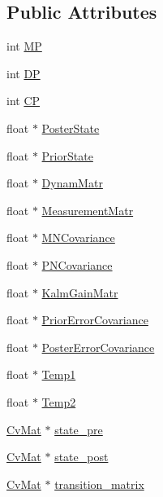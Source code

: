 \subsection*{Public Attributes}
\begin{DoxyCompactItemize}
\item 
int \hyperlink{structCvKalman_a1e9c56ae3f138a19c67d607379e445d9}{M\-P}
\item 
int \hyperlink{structCvKalman_a0202618820441a41c5188efddae52a43}{D\-P}
\item 
int \hyperlink{structCvKalman_a0a505ce26c5a6e310cd37f1694c2f782}{C\-P}
\item 
float $\ast$ \hyperlink{structCvKalman_a39b06cee56cb2209c3a5053123652976}{Poster\-State}
\item 
float $\ast$ \hyperlink{structCvKalman_a416cb36df4c9775a930f3a6a8dc19d7e}{Prior\-State}
\item 
float $\ast$ \hyperlink{structCvKalman_ae45757e0a85d1f1af2f3fa61850fc067}{Dynam\-Matr}
\item 
float $\ast$ \hyperlink{structCvKalman_a1152831760f263f51612dd364e3f4a22}{Measurement\-Matr}
\item 
float $\ast$ \hyperlink{structCvKalman_aba4fdb4f915c18e278ee33296586cf74}{M\-N\-Covariance}
\item 
float $\ast$ \hyperlink{structCvKalman_a01e5ed7f67dbcb0f1c774f294795b993}{P\-N\-Covariance}
\item 
float $\ast$ \hyperlink{structCvKalman_a3dab3b4d870cf1dfafc087d6a25824ad}{Kalm\-Gain\-Matr}
\item 
float $\ast$ \hyperlink{structCvKalman_af11cb151f1294a1c319e075493c70025}{Prior\-Error\-Covariance}
\item 
float $\ast$ \hyperlink{structCvKalman_a15dd932449d473a021634bca219404be}{Poster\-Error\-Covariance}
\item 
float $\ast$ \hyperlink{structCvKalman_a0b5456e55bf064a623ff71c9346c905d}{Temp1}
\item 
float $\ast$ \hyperlink{structCvKalman_a35ee9fe1dabc5b27df89a423f9801c8b}{Temp2}
\item 
\hyperlink{structCvMat}{Cv\-Mat} $\ast$ \hyperlink{structCvKalman_a7ce8d18d6af3a2d919886de2ecbea961}{state\-\_\-pre}
\item 
\hyperlink{structCvMat}{Cv\-Mat} $\ast$ \hyperlink{structCvKalman_a2dcade041ae355d1db793bddc7b8291b}{state\-\_\-post}
\item 
\hyperlink{structCvMat}{Cv\-Mat} $\ast$ \hyperlink{structCvKalman_a9bc599a7f1197f20cbe93ed6ea3611ac}{transition\-\_\-matrix}

\end{DoxyCompactItemize}
